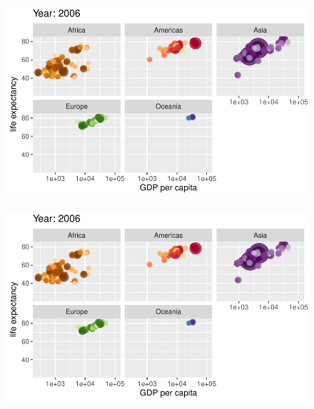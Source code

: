 \documentclass[
  letterpaper,
  DIV=11,
  numbers=noendperiod]{scrartcl}
\begin{document}
\begin{figure}[H]

{\centering \includegraphics{class05_files/figure-pdf/unnamed-chunk-24-98.pdf}

}

\end{figure}

\begin{figure}[H]

{\centering \includegraphics{class05_files/figure-pdf/unnamed-chunk-24-99.pdf}

}

\end{figure}
\end{document}

